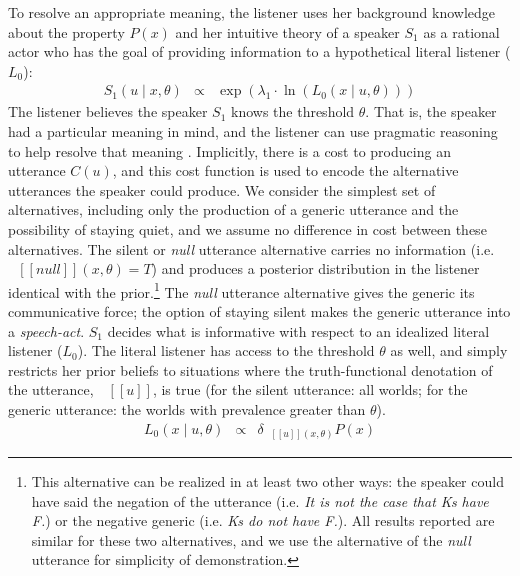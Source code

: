 \documentclass[12pt,letterpaper]{article}
\newcommand{\denote}[1]{\mbox{ $[\![ #1 ]\!]$}}
\begin{document}
To resolve an appropriate meaning, the listener uses her background knowledge about the property $P(x)$ and her intuitive theory of a speaker $S_1$ as a rational actor who has the goal of providing information to a hypothetical literal listener ($L_0$):
\begin{eqnarray}
S_{1}(u \mid x, \theta) &\propto& \exp{(\lambda_1 \cdot \ln  ( {L_{0}(x \mid u, \theta)} ) ) }\label{eq:S1}
\end{eqnarray}
%
The listener believes the speaker $S_1$ knows the threshold $\theta$.
That is, the speaker had a particular meaning in mind, and the listener can use pragmatic reasoning to help resolve that meaning \cite{Lassiter2013, Lassiter2015, GoodmanLassiter}. 
Implicitly, there is a cost to producing an utterance $C(u)$, and this cost function is used to encode the alternative utterances the speaker could produce. 
We consider the simplest set of alternatives, including only the production of a generic utterance and the possibility of staying quiet, and we assume no difference in cost between these alternatives. 
The silent or \emph{null} utterance alternative carries no information (i.e.~$\denote{null}(x, \theta)=T$) and produces a posterior distribution in the listener identical with the prior.\footnote{
This alternative can be realized in at least two other ways: the speaker could have said the negation of the utterance (i.e. \emph{It is not the case that Ks have F.}) or the negative generic (i.e. \emph{Ks do not have F.}). All results reported are similar for these two alternatives, and we use the alternative of the \emph{null} utterance for simplicity of demonstration.
}
The \emph{null} utterance alternative gives the generic its communicative force; the option of staying silent makes the generic utterance into a \emph{speech-act}.
%
%
%
$S_1$ decides what is informative with respect to an idealized literal listener ($L_{0}$).
The literal listener has access to the threshold $\theta$ as well, and simply restricts her prior beliefs to situations where the truth-functional denotation of the utterance, $\denote{u}$, is true (for the silent utterance: all worlds; for the generic utterance: the worlds with prevalence greater than $\theta$).
%
\begin{eqnarray}
L_{0}(x \mid u, \theta) &\propto& {\delta_{\denote{u}(x, \theta)} P(x)} \label{eq:L0}
\end{eqnarray}
%
\end{document}
